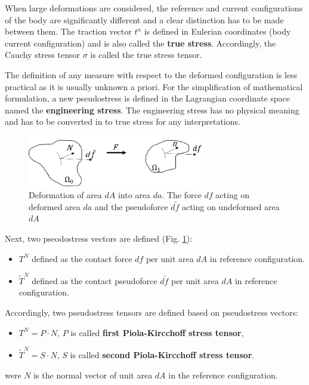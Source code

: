 When large deformations are considered, the reference and current configurations of the body are significantly different and a clear distinction has to be made between them. The traction vector $t^n$ is defined in Eulerian coordinates (body current configuration) and is also called the \textbf{true stress}. Accordingly, the Cauchy stress tensor $\sigma$ is called the true stress tensor.

The definition of any measure with respect to the deformed configuration is less practical as it is usually unknown a priori. For the simplification of mathematical formulation, a new pseudostress is defined in the Lagrangian coordinate space named the \textbf{engineering stress}. The engineering stress has no physical meaning and has to be converted in to true stress for any interpretations.


\begin{figure}
\begin{center}
\includegraphics[width=0.7\textwidth,keepaspectratio]{figures/stressnotion.png} 
\caption[]{Deformation of area $dA$  into area $da$. The force $df$ acting on deformed area $da$ and the pseudoforce $d\tilde{f}$ acting on undeformed area $dA$}
\label{stressnotion}
\end{center}
\end{figure} 


Next, two pseodostress vectors are defined (Fig. \ref{stressnotion}):
\begin{itemize}
\item $T^N$ defined as the contact force $df$ per unit area $dA$ in reference configuration.
\item $\tilde{T}^N$ defined as the contact pseudoforce $d\tilde{f}$ per unit area $dA$ in reference configuration.  
\end{itemize}


Accordingly, two pseudostress tensors are defined based on pseudostress vectors:
\begin{itemize}
\item $T^N = P \cdot N$, $P$ is called \textbf{first Piola-Kircchoff stress tensor},
\item  $\tilde{T}^N = S \cdot N $, $S$ is called \textbf{second Piola-Kircchoff stress tensor}. 
\end{itemize} 
were $N$ is the normal vector of unit area $dA$ in the reference configuration.

